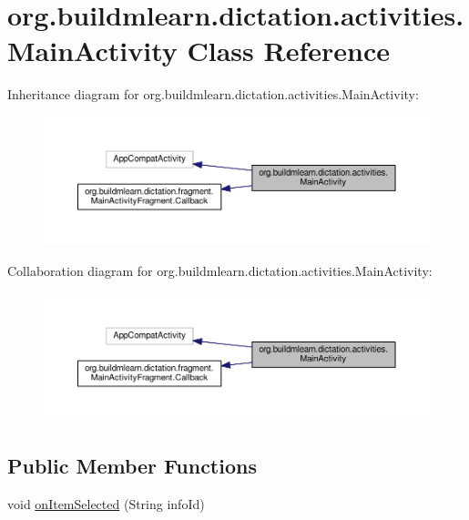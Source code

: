 \hypertarget{classorg_1_1buildmlearn_1_1dictation_1_1activities_1_1MainActivity}{}\section{org.\+buildmlearn.\+dictation.\+activities.\+Main\+Activity Class Reference}
\label{classorg_1_1buildmlearn_1_1dictation_1_1activities_1_1MainActivity}


Inheritance diagram for org.\+buildmlearn.\+dictation.\+activities.\+Main\+Activity\+:
\nopagebreak
\begin{figure}[H]
\begin{center}
\leavevmode
\includegraphics[width=350pt]{classorg_1_1buildmlearn_1_1dictation_1_1activities_1_1MainActivity__inherit__graph}
\end{center}
\end{figure}


Collaboration diagram for org.\+buildmlearn.\+dictation.\+activities.\+Main\+Activity\+:
\nopagebreak
\begin{figure}[H]
\begin{center}
\leavevmode
\includegraphics[width=350pt]{classorg_1_1buildmlearn_1_1dictation_1_1activities_1_1MainActivity__coll__graph}
\end{center}
\end{figure}
\subsection*{Public Member Functions}
\begin{DoxyCompactItemize}
\item 
void \hyperlink{classorg_1_1buildmlearn_1_1dictation_1_1activities_1_1MainActivity_a6374d2e872e209228e251e3c03646b78}{on\+Item\+Selected} (String info\+Id)
\end{DoxyCompactItemize}

